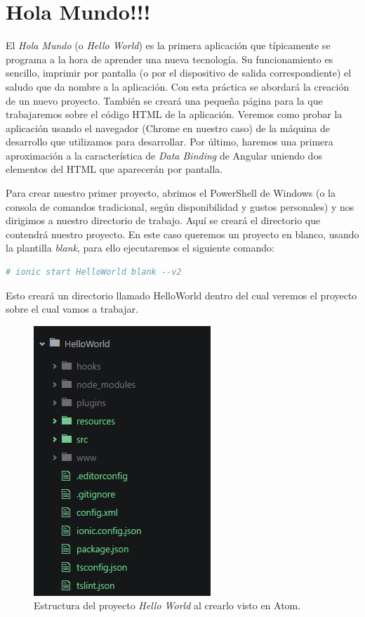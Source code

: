 \clearpage
\section{Hola Mundo!!!} \label{sec:hello}

El \emph{Hola Mundo} (o \emph{Hello World}) es la primera aplicación que típicamente se programa a la hora de aprender una nueva tecnología. Su funcionamiento es sencillo, imprimir por pantalla (o por el dispositivo de salida correspondiente) el saludo que da nombre a la aplicación. Con esta práctica se abordará la creación de un nuevo proyecto. También se creará una pequeña página para la que trabajaremos sobre el código \gls{HTML} de la aplicación. Veremos como probar la aplicación usando el navegador (Chrome en nuestro caso) de la máquina de desarrollo que utilizamos para desarrollar. Por último, haremos una primera aproximación a la característica de \emph{Data Binding} de Angular uniendo dos elementos del \gls{HTML} que aparecerán por pantalla.

Para crear nuestro primer proyecto, abrimos el PowerShell de Windows (o la consola de comandos tradicional, según disponibilidad y gustos personales) y nos dirigimos a nuestro directorio de trabajo. Aquí se creará el directorio que contendrá nuestro proyecto. En este caso queremos un proyecto en blanco, usando la plantilla \emph{blank}, para ello ejecutaremos el siguiente comando:

\begin{lstlisting}[language=bash]
  # ionic start HelloWorld blank --v2
\end{lstlisting}

Esto creará un directorio llamado HelloWorld dentro del cual veremos el proyecto sobre el cual vamos a trabajar.


\begin{figure}[H]
\centering
  \includegraphics[height=0.4\textheight,keepaspectratio]{Figures/ch2/HelloWorld/atom_project_structure}
  \caption{Estructura del proyecto \emph{Hello World} al crearlo visto en Atom.}
\end{figure}

